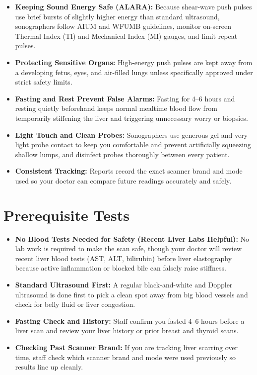 \begin{itemize}
    \item \textbf{Keeping Sound Energy Safe (ALARA):} Because shear-wave push pulses use brief bursts of slightly higher energy than standard ultrasound, sonographers follow AIUM and WFUMB guidelines, monitor on-screen Thermal Index (TI) and Mechanical Index (MI) gauges, and limit repeat pulses.
    \item \textbf{Protecting Sensitive Organs:} High-energy push pulses are kept away from a developing fetus, eyes, and air-filled lungs unless specifically approved under strict safety limits.
    \item \textbf{Fasting and Rest Prevent False Alarms:} Fasting for 4--6 hours and resting quietly beforehand keeps normal mealtime blood flow from temporarily stiffening the liver and triggering unnecessary worry or biopsies.
    \item \textbf{Light Touch and Clean Probes:} Sonographers use generous gel and very light probe contact to keep you comfortable and prevent artificially squeezing shallow lumps, and disinfect probes thoroughly between every patient.
    \item \textbf{Consistent Tracking:} Reports record the exact scanner brand and mode used so your doctor can compare future readings accurately and safely.
\end{itemize}

\section{Prerequisite Tests}

\begin{itemize}
    \item \textbf{No Blood Tests Needed for Safety (Recent Liver Labs Helpful):} No lab work is required to make the scan safe, though your doctor will review recent liver blood tests (AST, ALT, bilirubin) before liver elastography because active inflammation or blocked bile can falsely raise stiffness.
    \item \textbf{Standard Ultrasound First:} A regular black-and-white and Doppler ultrasound is done first to pick a clean spot away from big blood vessels and check for belly fluid or liver congestion.
    \item \textbf{Fasting Check and History:} Staff confirm you fasted 4--6 hours before a liver scan and review your liver history or prior breast and thyroid scans.
    \item \textbf{Checking Past Scanner Brand:} If you are tracking liver scarring over time, staff check which scanner brand and mode were used previously so results line up cleanly.
\end{itemize}

